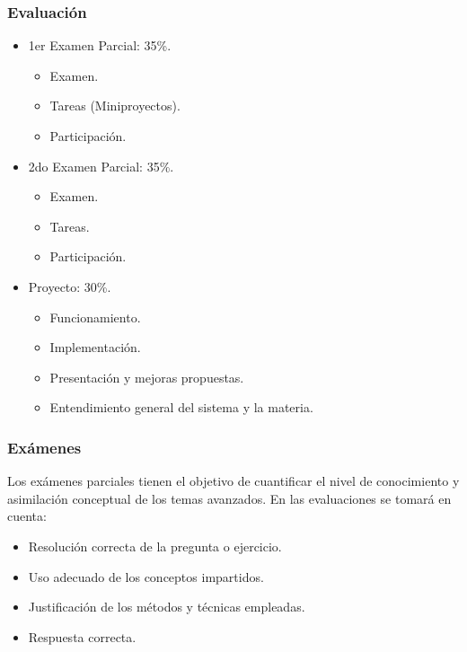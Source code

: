 \documentclass[10pt]{beamer}
\begin{document}
\begin{frame}
    \frametitle{Evaluación}
    \begin{itemize}
        \item 1er Examen Parcial: \alert{35\%}.
            \begin{itemize}
                \item Examen.
                \item Tareas (Miniproyectos).
                \item Participación.
            \end{itemize}
        \item 2do Examen Parcial: \alert{35\%}.
            \begin{itemize}
                \item Examen.
                \item Tareas.
                \item Participación.
            \end{itemize}
        \item Proyecto: \alert{30\%}.
            \begin{itemize}
                \item Funcionamiento.
                \item Implementación.
                \item Presentación y mejoras propuestas.
                \item Entendimiento general del sistema y la materia.
            \end{itemize}
    \end{itemize}
\end{frame}

\begin{frame}
    \frametitle{Exámenes}
    Los exámenes parciales tienen el objetivo de cuantificar el nivel de conocimiento 
    y asimilación conceptual de los temas avanzados. En las evaluaciones se tomará en cuenta:
    \begin{itemize}
        \item Resolución correcta de la pregunta o ejercicio.
        \item Uso adecuado de los conceptos impartidos.
        \item Justificación de los métodos y técnicas empleadas.
        \item Respuesta correcta.
    \end{itemize}
\end{frame}
\end{document}

